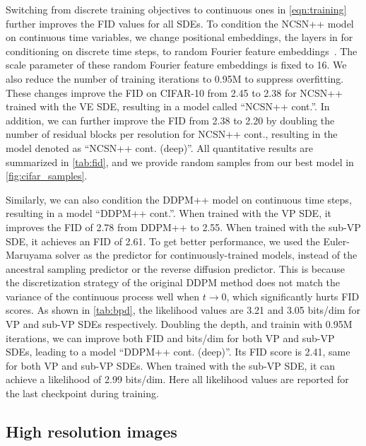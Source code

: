 \documentclass{article} %
\begin{document}
Switching from discrete training objectives to continuous ones in \cref{eqn:training} further improves the FID values for all SDEs. To condition the NCSN++ model on continuous time variables, we change positional embeddings, the layers in \citet{ho2020denoising} for conditioning on discrete time steps, to random Fourier feature embeddings~\citep{tancik2020fourfeat}. The scale parameter of these random Fourier feature embeddings is fixed to 16. We also reduce the number of training iterations to 0.95M to suppress overfitting. These changes improve the FID on CIFAR-10 from 2.45 to 2.38 for NCSN++ trained with the VE SDE, resulting in a model called ``NCSN++ cont.''. In addition, we can further improve the FID from 2.38 to 2.20 by doubling the number of residual blocks per resolution for NCSN++ cont., resulting in the model denoted as ``NCSN++ cont. (deep)''. All quantitative results are summarized in \cref{tab:fid}, and we provide random samples from our best model in \cref{fig:cifar_samples}. 

Similarly, we can also condition the DDPM++ model on continuous time steps, resulting in a model ``DDPM++ cont.''. When trained with the VP SDE, it improves the FID of 2.78 from DDPM++ to 2.55. When trained with the sub-VP SDE, it achieves an FID of 2.61. To get better performance, we used the Euler-Maruyama solver as the predictor for continuously-trained models, instead of the ancestral sampling predictor or the reverse diffusion predictor. This is because the discretization strategy of the original DDPM method does not match the variance of the continuous process well when $t\to 0$, which significantly hurts FID scores. As shown in \cref{tab:bpd}, the likelihood values are 3.21 and 3.05 bits/dim for VP and sub-VP SDEs respectively. Doubling the depth, and trainin with 0.95M iterations, we can improve both FID and bits/dim for both VP and sub-VP SDEs, leading to a model ``DDPM++ cont. (deep)''. Its FID score is 2.41, same for both VP and sub-VP SDEs. When trained with the sub-VP SDE, it can achieve a likelihood of 2.99 bits/dim. Here all likelihood values are reported for the last checkpoint during training.



\subsection{High resolution images} 
\label{app:hq}
\end{document}
